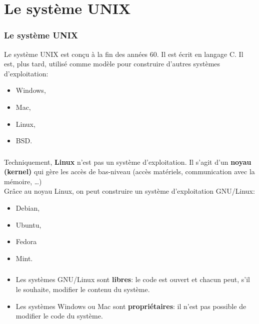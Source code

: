\documentclass[svgnames,11pt]{beamer}
\begin{document}
\section{Le système UNIX}
\begin{frame}
    \frametitle{Le système UNIX}
\begin{aretenir}[]
Le système UNIX est conçu à la fin des années 60. Il est écrit en langage C. Il est, plus tard, utilisé comme modèle pour construire d'autres systèmes d'exploitation:
\begin{itemize}
    \item Windows,
    \item Mac,
    \item Linux,
    \item BSD.
\end{itemize}
\end{aretenir}

\end{frame}
\begin{frame}
    \frametitle{}

    \begin{aretenir}[]
    Techniquement, \textbf{Linux} n'est pas un système d'exploitation. Il s'agit d'un \textbf{noyau (kernel)} qui gère les accès de bas-niveau (accès matériels, communication avec la mémoire, \dots)\\
    Grâce au noyau Linux, on peut construire un système d'exploitation GNU/Linux:
    \begin{itemize}
        \item Debian,
        \item Ubuntu,
        \item Fedora
        \item Mint.
    \end{itemize}
    \end{aretenir}

\end{frame}
\begin{frame}
    \frametitle{}

    \begin{aretenir}[]
    \begin{itemize}
        \item <1-> Les systèmes GNU/Linux sont \textbf{libres}: le code est ouvert et chacun peut, s'il le souhaite, modifier le contenu du système.
        \item <2-> Les systèmes Windows ou Mac sont \textbf{propriétaires}: il n'est pas possible de modifier le code du système.
    \end{itemize}
    \end{aretenir}

\end{frame}
\end{document}
